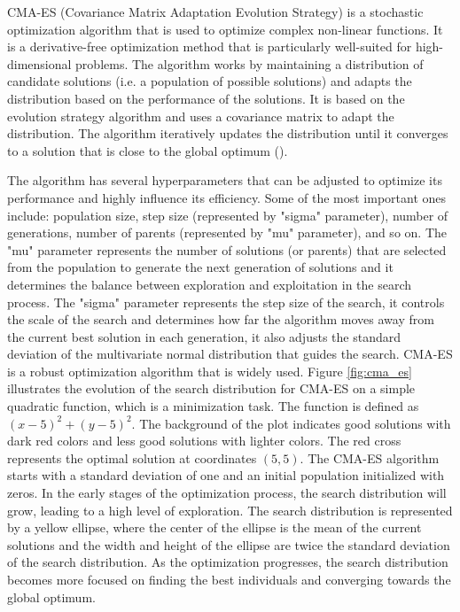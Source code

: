 CMA-ES (Covariance Matrix Adaptation Evolution Strategy) is a stochastic optimization algorithm that is used to optimize complex non-linear functions. It is a derivative-free optimization method that is particularly well-suited for high-dimensional problems. The algorithm works by maintaining a distribution of candidate solutions (i.e. a population of possible solutions) and adapts the distribution based on the performance of the solutions. It is based on the evolution strategy algorithm and uses a covariance matrix to adapt the distribution. The algorithm iteratively updates the distribution until it converges to a solution that is close to the global optimum (\cite{akimoto_theoretical_2012}).

The algorithm has several hyperparameters that can be adjusted to optimize its performance and highly influence its efficiency. Some of the most important ones include: population size, step size (represented by "sigma" parameter), number of generations, number of parents (represented by "mu" parameter), and so on. The "mu" parameter represents the number of solutions (or parents) that are selected from the population to generate the next generation of solutions and it determines the balance between exploration and exploitation in the search process. The "sigma" parameter represents the step size of the search, it controls the scale of the search and determines how far the algorithm moves away from the current best solution in each generation, it also adjusts the standard deviation of the multivariate normal distribution that guides the search. CMA-ES is a robust optimization algorithm that is widely used. Figure \ref{fig:cma_es} illustrates the evolution of the search distribution for CMA-ES on a simple quadratic function, which is a minimization task. The function is defined as $(x - 5) ^ 2 + (y - 5) ^ 2$. The background of the plot indicates good solutions with dark red colors and less good solutions with lighter colors. The red cross represents the optimal solution at coordinates $(5,5)$. The CMA-ES algorithm starts with a standard deviation of one and an initial population initialized with zeros. In the early stages of the optimization process, the search distribution will grow, leading to a high level of exploration. The search distribution is represented by a yellow ellipse, where the center of the ellipse is the mean of the current solutions and the width and height of the ellipse are twice the standard deviation of the search distribution. As the optimization progresses, the search distribution becomes more focused on finding the best individuals and converging towards the global optimum.

